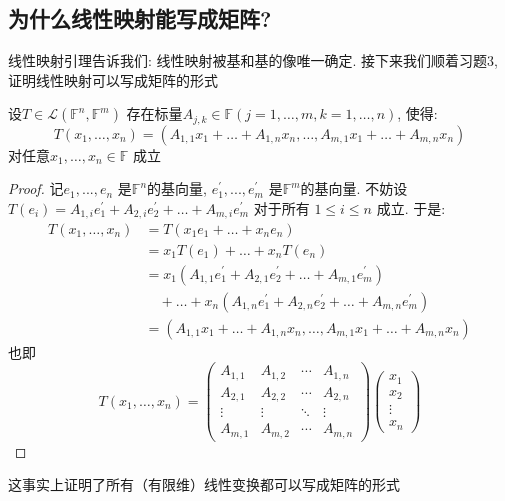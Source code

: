 \subsection{为什么线性映射能写成矩阵?}
线性映射引理告诉我们: 线性映射被基和基的像唯一确定. 接下来我们顺着习题3, 证明线性映射可以写成矩阵的形式
\begin{theorem}
    设\(T \in \mathscr{L}(\mathbb{F}^{n},\mathbb{F}^{m})\)
    存在标量\(A_{j,k} \in
    \mathbb{F} (j = 1, \dots ,m, k=1, \dots, n) \), 使得:
    \[
        T(x_{1},\dots,x_{n})=(A_{1,1}x_{1}+\dots+A_{1,n}x_{n},\dots,A_{m,1}x_{1}+\dots+A_{m,n}x_{n})
    \]
    对任意\(x_{1},\dots,x_{n} \in \mathbb{F}\) 成立
\end{theorem}

\begin{proof}
    记\(e_{1}, ..., e_{n}\) 是\(\mathbb{F}^{n}\)的基向量,
    \(e^{\prime}_{1}, ..., e^{\prime}_{m}\) 是\(\mathbb{F}^{m}\)的基向量.
    不妨设 \(T(e_{i}) = A_{1,i}e^{\prime}_{1} +
        A_{2,i}e^{\prime}_{2} + \ldots +
    A_{m,i}e^{\prime}_{m}\) 对于所有 \(1\leq i\leq n\) 成立.
    于是:
    \begin{align*}
        T(x_{1},\dots,x_{n}) &= T(x_{1}e_{1} + \ldots +
        x_{n}e_{n})\\
        &= x_{1}T(e_{1}) + \ldots + x_{n}T(e_{n})\\
        &= x_{1}(A_{1,1}e^{\prime}_{1} + A_{2,1}e^{\prime}_{2} +
        \ldots + A_{m,1}e^{\prime}_{m}) \nonumber \\
        &\quad + \ldots +
        x_{n}(A_{1,n}e^{\prime}_{1} + A_{2,n}e^{\prime}_{2} +
        \ldots + A_{m,n}e^{\prime}_{m})\\    &=
        (A_{1,1}x_{1}+\dots+A_{1,n}x_{n},\dots,A_{m,1}x_{1}+\dots+A_{m,n}x_{n})
    \end{align*}
    也即\[
        T(x_1, \dots, x_n) =
        \begin{pmatrix}
            A_{1,1} & A_{1,2} & \cdots & A_{1,n} \\
            A_{2,1} & A_{2,2} & \cdots & A_{2,n} \\
            \vdots  & \vdots  & \ddots & \vdots  \\
            A_{m,1} & A_{m,2} & \cdots & A_{m,n}
        \end{pmatrix}
        \begin{pmatrix}
            x_1 \\
            x_2 \\
            \vdots \\
            x_n
        \end{pmatrix}
    \]
\end{proof}
这事实上证明了所有（有限维）线性变换都可以写成矩阵的形式

